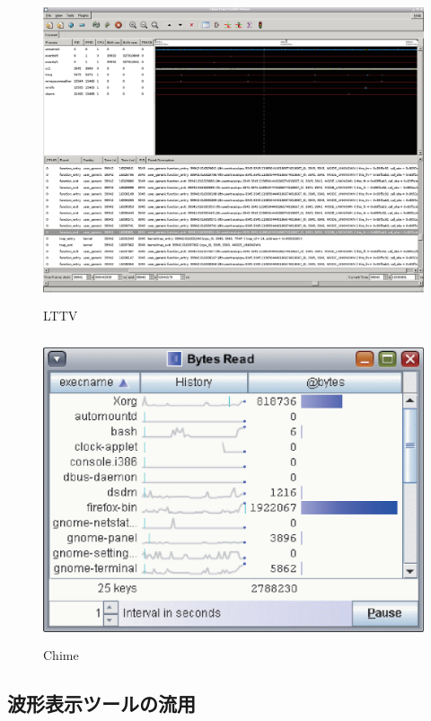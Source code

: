\begin{figure}[p]
\begin{center}
\includegraphics[height=9cm]{img/LTTV.eps}
\caption{LTTV}
\label{fig:LTTV}
\end{center}
\end{figure}

\begin{figure}[p]
\begin{center}
\includegraphics[height=9cm]{img/Chime.eps}
\caption{Chime}
\label{fig:Chime}
\end{center}
\end{figure}

\subsection{波形表示ツールの流用}

